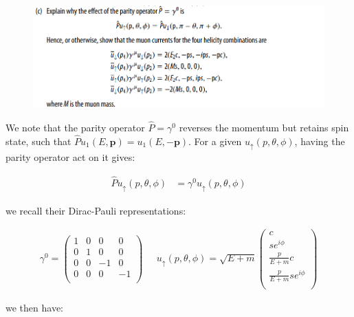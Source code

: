 \documentclass[11pt]{article}
\theoremstyle{definition}
\begin{document}

\newpage
\begin{figure}[H]
    \centering
    \includegraphics[scale = 0.5]{6.7c.png}
\end{figure}

We note that the parity operator $\hat{P} = \gamma^{0}$ reverses the momentum but retains spin state, such that $\hat{P}u_1(E,\mathbf{p}) = u_1(E,-\mathbf{p})$. For a given $u_{\uparrow}(p,\theta,\phi)$, having the parity operator act on it gives:

\begin{align}
    \hat{P}u_{\uparrow}(p,\theta,\phi) &= \gamma^{0}u_{\uparrow}(p,\theta,\phi)
\end{align}

we recall their Dirac-Pauli representations:

\begin{align}
    \gamma^0 =
    \begin{pmatrix}
        1 & 0 & 0 & 0\\
        0 & 1 & 0 & 0\\
        0 & 0 & -1 & 0\\
        0 & 0 & 0 & -1\\
    \end{pmatrix}
    \;\;\;\;\;
    u_{\uparrow}(p,\theta,\phi) = \sqrt{E+m}
    \begin{pmatrix}
        c\\
        se^{i\phi}\\
        \frac{p}{E+m}c\\
        \frac{p}{E+m}se^{i\phi}\\
    \end{pmatrix}
\end{align}

we then have:
\end{document}
